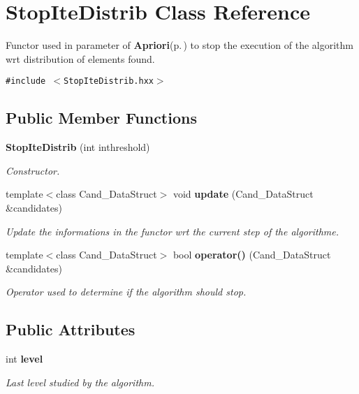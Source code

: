 \section{Stop\-Ite\-Distrib Class Reference}
\label{class_stop_ite_distrib}
Functor used in parameter of {\bf Apriori}{\rm (p.\,\pageref{class_apriori})} to stop the execution of the algorithm wrt distribution of elements found.  


{\tt \#include $<$Stop\-Ite\-Distrib.hxx$>$}

\subsection*{Public Member Functions}
\begin{CompactItemize}
\item 
{\bf Stop\-Ite\-Distrib} (int inthreshold)\label{class_stop_ite_distrib_2a09ac7b4eb5215720e4e704085dc356}

\begin{CompactList}\small\item\em Constructor. \item\end{CompactList}\item 
template$<$class Cand\_\-Data\-Struct$>$ void {\bf update} (Cand\_\-Data\-Struct \&candidates)
\begin{CompactList}\small\item\em Update the informations in the functor wrt the current step of the algorithme. \item\end{CompactList}\item 
template$<$class Cand\_\-Data\-Struct$>$ bool {\bf operator()} (Cand\_\-Data\-Struct \&candidates)
\begin{CompactList}\small\item\em Operator used to determine if the algorithm should stop. \item\end{CompactList}\end{CompactItemize}
\subsection*{Public Attributes}
\begin{CompactItemize}
\item 
int {\bf level}\label{class_stop_ite_distrib_4e439159feb6fb1117a9b5ca471121ca}

\begin{CompactList}\small\item\em Last level studied by the algorithm. \item\end{CompactList}\end{CompactItemize}
